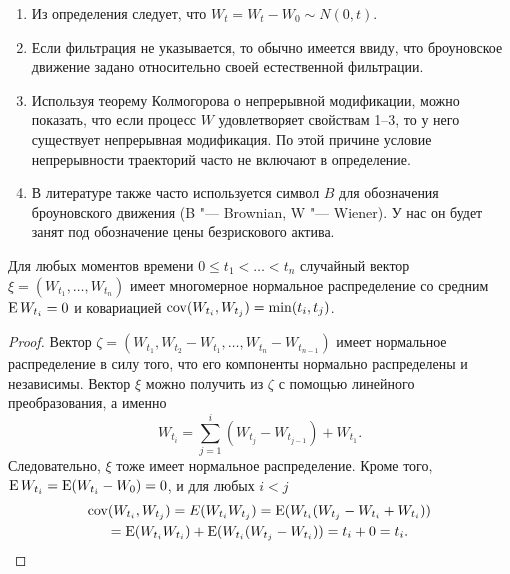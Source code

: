 \begin{remark}
\begin{enumerate}
\item Из определения следует, что $W_t=W_t-W_0\sim N(0,t)$. 

\item Если фильтрация не указывается, то обычно имеется ввиду, что броуновское движение задано относительно своей естественной фильтрации.

\item Используя теорему Колмогорова о непрерывной модификации, можно показать, что если процесс $W$ удовлетворяет свойствам 1--3, то у него существует непрерывная модификация.
По этой причине условие непрерывности траекторий часто не включают в определение.

\item В литературе также часто используется символ $B$ для обозначения броуновского движения (B "--- Brownian, W "--- Wiener). У нас он будет занят под обозначение цены безрискового актива.
\end{enumerate}
\end{remark}

\begin{proposition}
Для любых моментов времени $0\le t_1<\dots<t_n$ случайный вектор $\xi = (W_{t_1}, \ldots, W_{t_n})$ имеет многомерное нормальное распределение со средним $\operatorname{E} W_{t_i} = 0$ и ковариацией $\operatorname{cov}(W_{t_i}, W_{t_j}) = \min(t_i,t_j)$.
\end{proposition}

\begin{proof}
Вектор $\zeta = (W_{t_1}, W_{t_2} - W_{t_1}, \ldots, W_{t_n} - W_{t_{n-1}})$ имеет нормальное распределение в силу того, что его компоненты нормально распределены и независимы. 
Вектор $\xi$ можно получить из $\zeta$ с помощью линейного преобразования, а именно
\[
W_{t_i} = \sum_{j=1}^i (W_{t_j} - W_{t_{j-1}}) + W_{t_1}.
\]
Следовательно, $\xi$ тоже имеет нормальное распределение. 
Кроме того, $\operatorname{E} W_{t_i} = \operatorname{E} (W_{t_i} - W_{0}) = 0$, и для любых $i < j$
\begin{multline*}
\operatorname{cov}(W_{t_i}, W_{t_j}) = E(W_{t_i}W_{t_j}) = \operatorname{E} (W_{t_i}(W_{t_j} - W_{t_i} + W_{t_i})) \\
= \operatorname{E} (W_{t_i}W_{t_i}) + \operatorname{E} (W_{t_i}(W_{t_j} - W_{t_i})) = t_i + 0 = t_i.
\end{multline*}
\end{proof}

